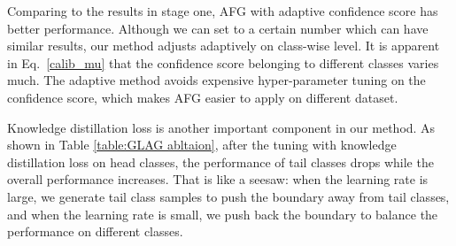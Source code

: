 \documentclass[runningheads]{llncs}
\begin{document}
Comparing to the results in stage one, AFG with adaptive confidence score  has better performance. Although we can set  to a certain number which can have similar results, our method adjusts  adaptively on class-wise level. It is apparent in Eq.~\ref{calib_mu} that the confidence score belonging to different classes varies much. The adaptive method avoids expensive hyper-parameter tuning on the confidence score, which makes AFG easier to apply on different dataset. 

Knowledge distillation loss is another important component in our method. As shown in Table \ref{table:GLAG abltaion}, after the tuning with knowledge distillation loss on head classes, the performance of tail classes drops while the overall performance increases. That is like a seesaw: when the learning rate is large, we generate tail class samples to push the boundary away from tail classes, and when the learning rate is small, we push back the boundary to balance the performance on different classes. 



\setlength{\tabcolsep}{4pt}
\begin{table}
\begin{center}
\caption{Ablation study of GLAG on CIFAR100-LT. CE: cross-entropy loss in stage one. GraLoss: gradual balanced loss in stage one. Logitloss: logit adjust loss \cite{menon2020long} in stage one. AD: 
adaptive confidence score  in stage two. KD: knowledge distillation loss for head classes in stage two.}
\label{table:GLAG abltaion}
\end{center}
\end{table}
\setlength{\tabcolsep}{1.4pt}
\end{document}

